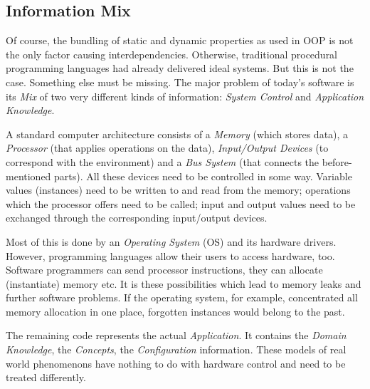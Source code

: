 %
%
%
%
%
%
%

\subsection{Information Mix}
\label{information_mix_heading}

Of course, the bundling of static and dynamic properties as used in OOP is not
the only factor causing interdependencies. Otherwise, traditional procedural
programming languages had already delivered ideal systems. But this is not the
case. Something else must be missing. The major problem of today's software is
its \emph{Mix} of two very different kinds of information: \emph{System Control}
and \emph{Application Knowledge}.

A standard computer architecture consists of a \emph{Memory} (which stores data),
a \emph{Processor} (that applies operations on the data), \emph{Input/Output Devices}
(to correspond with the environment) and a \emph{Bus System} (that connects the
before-mentioned parts). All these devices need to be controlled in some way.
Variable values (instances) need to be written to and read from the memory;
operations which the processor offers need to be called; input and output values
need to be exchanged through the corresponding input/output devices.

Most of this is done by an \emph{Operating System} (OS) and its hardware drivers.
However, programming languages allow their users to access hardware, too. Software
programmers can send processor instructions, they can allocate (instantiate)
memory etc. It is these possibilities which lead to memory leaks and further
software problems. If the operating system, for example, concentrated all memory
allocation in one place, forgotten instances would belong to the past.

The remaining code represents the actual \emph{Application}. It contains the
\emph{Domain Knowledge}, the \emph{Concepts}, the \emph{Configuration} information.
These models of real world phenomenons have nothing to do with hardware control
and need to be treated differently.
